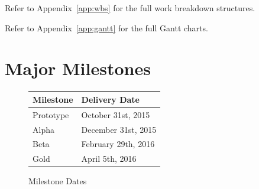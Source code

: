\documentclass{GlobalDocument}
\begin{document}
Refer to Appendix~\ref{app:wbs} for the full work breakdown structures.

Refer to Appendix~\ref{app:gantt} for the full Gantt charts.




\section{Major Milestones}
\begin{figure}[htb]
\centering
\begin{tabular}{|l|l|}
\hline
{\bf Milestone} & {\bf Delivery Date}          \\ \hline
Prototype       & October 31st, 2015  \\ \hline
Alpha           & December 31st, 2015 \\ \hline
Beta            & February 29th, 2016 \\ \hline
Gold            & April 5th, 2016     \\ \hline
\end{tabular}
\caption{Milestone Dates}
\label{	Milestones Dates}
\end{figure}
\end{document}
